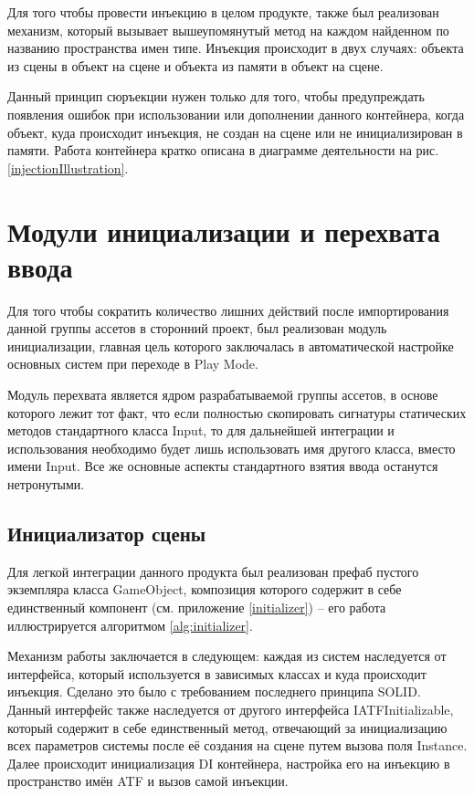 Для того чтобы провести инъекцию в целом продукте, также был реализован механизм, который вызывает вышеупомянутый метод на каждом найденном по названию пространства имен типе. Инъекция происходит в двух случаях: объекта из сцены в объект на сцене и объекта из памяти в объект на сцене. 

Данный принцип сюръекции нужен только для того, чтобы предупреждать появления ошибок при использовании или дополнении данного контейнера, когда объект, куда происходит инъекция, не создан на сцене или не инициализирован в памяти. Работа контейнера кратко описана в диаграмме деятельности на рис. \ref{injectionIllustration}.

\section{Модули инициализации и перехвата ввода}
Для того чтобы сократить количество лишних действий после импортирования данной группы ассетов в сторонний проект, был реализован модуль инициализации, главная цель которого заключалась в автоматической настройке основных систем при переходе в Play Mode.

Модуль перехвата является ядром разрабатываемой группы ассетов, в основе которого лежит тот факт, что если полностью скопировать сигнатуры статических методов стандартного класса Input, то для дальнейшей интеграции и использования необходимо будет лишь использовать имя другого класса, вместо имени Input. Все же основные аспекты стандартного взятия ввода останутся нетронутыми.

\subsection{Инициализатор сцены}
Для легкой интеграции данного продукта был реализован префаб пустого экземпляра класса GameObject, композиция которого содержит в себе единственный компонент (см. приложение \ref{initializer}) -- его работа  иллюстрируется алгоритмом \ref{alg:initializer}.

Механизм работы заключается в следующем: каждая из систем наследуется от интерфейса, который используется в зависимых классах и куда происходит инъекция. Сделано это было с требованием последнего принципа SOLID. Данный интерфейс также наследуется от другого интерфейса IATFInitializable, который содержит в себе единственный метод, отвечающий за инициализацию всех параметров системы после её создания на сцене путем вызова поля Instance. Далее происходит инициализация DI контейнера, настройка его на инъекцию в пространство имён ATF и вызов самой инъекции.


